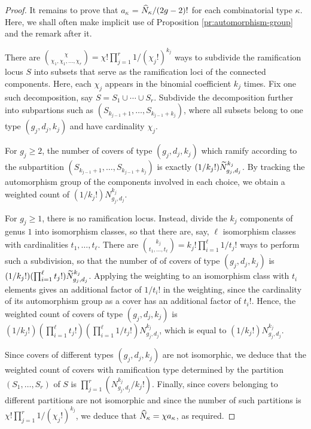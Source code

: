 \begin{proof}
 It remains to prove that $a_\kappa$ = $\widehat{N}_\kappa/(2g-2)!$ for each combinatorial type $\kappa$. Here, we shall often make implicit use of Proposition \ref{pr:automorphism-group} and the remark after it.
  
  There are $\binom{\chi}{\chi_1,\chi_1,\dotsc,\chi_r}=\chi!\prod_{j=1}^r 1/(\chi_j!)^{k_j}$ ways to subdivide the ramification locus $S$ into subsets that serve as the ramification loci of the connected components. Here, each $\chi_j$ appears in the binomial coefficient $k_j$ times. Fix one such decomposition, say $S=S_1 \cup \cdots \cup S_r$. Subdivide the decomposition further into subpartions such as $(S_{k_{j-1}+1},\dotsc,S_{k_{j-1}+k_j})$, where all subsets belong to one type $(g_j,d_j,k_j)$ and have cardinality $\chi_j$.

  For $g_j\geq 2$, the number of covers of type $(g_j,d_j,k_j)$ which ramify according to the subpartition $(S_{k_{j-1}+1},\dotsc,S_{k_{j-1}+k_j})$ is exactly $(1/k_j!) \widetilde{N}_{g_j,d_j}^{k_j}$. By tracking the automorphism group of the components involved in each choice, we obtain a weighted count of $(1/k_j!) N_{g_j,d_j}^{k_j}$.

  For $g_j\geq1$, there is no ramification locus.
  Instead, divide the $k_j$ components of genus $1$ into isomorphism classes, so that there are, say, $\ell$ isomorphism classes with cardinalities $t_1,\dotsc,t_\ell$.
  There are $\binom{k_j}{t_1,\dotsc,t_\ell}=k_j!\prod_{i=1}^\ell  1/t_j!$ ways to perform such a subdivision, so that the number of of covers of type $(g_j,d_j,k_j)$ is $(1/k_j!)(\prod_{i=1}^\ell t_j!)\widetilde{N}_{g_j,d_j}^{k_j}$.
  Applying the weighting to an isomorphism class with $t_i$ elements gives an additional factor of $1/t_i!$ in the weighting, since the cardinality of its automorphism group as a cover has an additional factor of $t_i!$. Hence, the weighted count of covers of type $(g_j,d_j,k_j)$ is $(1/k_j!)(\prod_{i=1}^\ell t_j!)(\prod_{i=1}^\ell 1/t_j!){N}_{g_j,d_j}^{k_j}$, which is equal to $(1/k_j!) N_{g_j,d_j}^{k_j}$.

  Since covers of different types $(g_j,d_j,k_j)$ are not isomorphic, we deduce that the weighted count of covers with ramification type determined by the partition $(S_1, \dotsc, S_r)$ of $S$ is $\prod_{j=1}^r(N^{k_j}_{g_j,d_j}/k_j!)$. Finally, since covers belonging to different partitions are not isomorphic and since the number of such partitions is $\chi!\prod_{j=1}^r 1/(\chi_j!)^{k_j}$, we deduce that $\widehat{N}_\kappa=\chi a_\kappa$, as required.
\end{proof}